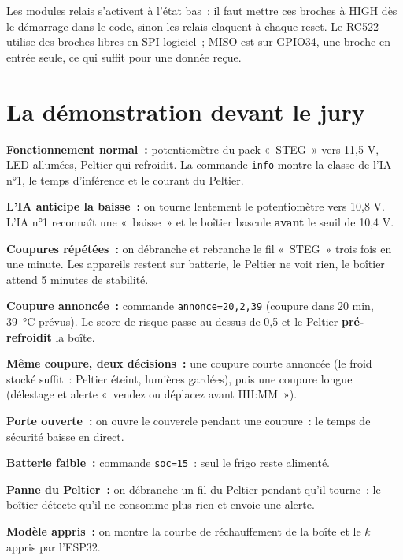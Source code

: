 \documentclass[10pt,a4paper]{article}
\begin{document}
{\small Les modules relais s'activent à l'état bas~: il faut mettre ces broches à HIGH dès le démarrage dans le code, sinon les relais claquent à chaque reset. Le RC522 utilise des broches libres en SPI logiciel~; MISO est sur GPIO34, une broche en entrée seule, ce qui suffit pour une donnée reçue.}

\section{La démonstration devant le jury}
\begin{steps}
  \item \textbf{Fonctionnement normal~:} potentiomètre du pack «~STEG~» vers 11,5 V, LED allumées, Peltier qui refroidit. La commande \texttt{info} montre la classe de l'IA n°1, le temps d'inférence et le courant du Peltier.
  \item \textbf{L'IA anticipe la baisse~:} on tourne lentement le potentiomètre vers 10,8 V. L'IA n°1 reconnaît une «~baisse~» et le boîtier bascule \textbf{avant} le seuil de 10,4 V.
  \item \textbf{Coupures répétées~:} on débranche et rebranche le fil «~STEG~» trois fois en une minute. Les appareils restent sur batterie, le Peltier ne voit rien, le boîtier attend 5 minutes de stabilité.
  \item \textbf{Coupure annoncée~:} commande \texttt{annonce=20,2,39} (coupure dans 20 min, 39~°C prévus). Le score de risque passe au-dessus de 0,5 et le Peltier \textbf{pré-refroidit} la boîte.
  \item \textbf{Même coupure, deux décisions~:} une coupure courte annoncée (le froid stocké suffit~: Peltier éteint, lumières gardées), puis une coupure longue (délestage et alerte «~vendez ou déplacez avant HH:MM~»).
  \item \textbf{Porte ouverte~:} on ouvre le couvercle pendant une coupure~: le temps de sécurité baisse en direct.
  \item \textbf{Batterie faible~:} commande \texttt{soc=15}~: seul le frigo reste alimenté.
  \item \textbf{Panne du Peltier~:} on débranche un fil du Peltier pendant qu'il tourne~: le boîtier détecte qu'il ne consomme plus rien et envoie une alerte.
  \item \textbf{Modèle appris~:} on montre la courbe de réchauffement de la boîte et le $k$ appris par l'ESP32.
\end{steps}
\end{document}
